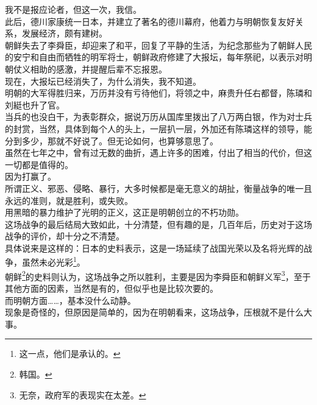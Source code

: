 \begin{multicols}{\theparacolNo}
我不是报应论者，但这一次，我信。\\

此后，德川家康统一日本，并建立了著名的德川幕府，他着力与明朝恢复友好关系，发展经济，颇有建树。\\

朝鲜失去了李舜臣，却迎来了和平，回复了平静的生活，为纪念那些为了朝鲜人民的安宁和自由而牺牲的明军将士，朝鲜政府修建了大报坛，每年祭祀，以表示对明朝仗义相助的感激，并提醒后辈不忘报恩。\\

现在，大报坛已经消失了，为什么消失，我不知道。\\

明朝的大军得胜归来，万历并没有亏待他们，将领之中，麻贵升任右都督，陈璘和刘綎也升了官。\\

当兵的也没白干，为表彰群众，据说万历从国库里拨出了八万两白银，作为对士兵的封赏，当然，具体到每个人的头上，一层扒一层，外加还有陈璘这样的领导，能分到多少，那就不好说了。但无论如何，也算够意思了。\\

虽然在七年之中，曾有过无数的曲折，遇上许多的困难，付出了相当的代价，但这一切都是值得的。\\

因为打赢了。\\

所谓正义、邪恶、侵略、暴行，大多时候都是毫无意义的胡扯，衡量战争的唯一且永远的准则，就是胜利，或失败。\\

用黑暗的暴力维护了光明的正义，这正是明朝创立的不朽功勋。\\

这场战争的最后结局大致如此，十分清楚，但有趣的是，几百年后，历史对于这场战争的评价，却十分之不清楚。\\

具体说来是这样的：日本的史料表示，这是一场延续了战国光荣以及名将光辉的战争，虽然未必光彩\footnote{这一点，他们是承认的。}。\\

朝鲜\footnote{韩国。}的史料则认为，这场战争之所以胜利，主要是因为李舜臣和朝鲜义军\footnote{无奈，政府军的表现实在太差。}，至于其他方面的因素，当然是有的，但似乎也是比较次要的。\\

而明朝方面……，基本没什么动静。\\

现象是奇怪的，但原因是简单的，因为在明朝看来，这场战争，压根就不是什么大事。\\


\end{multicols}
